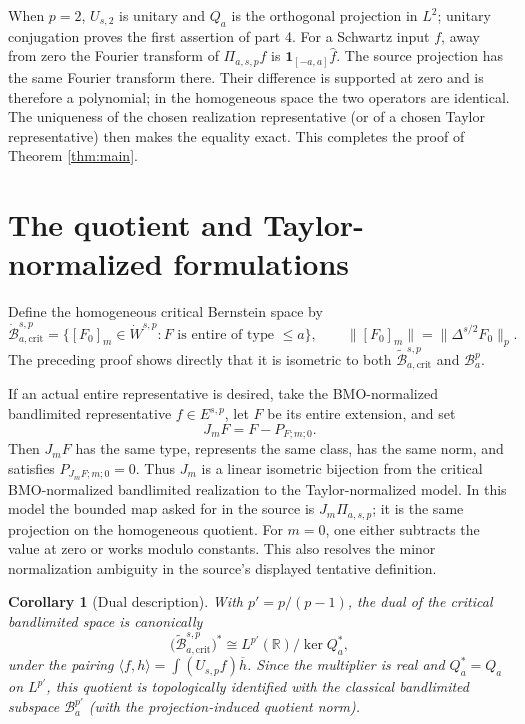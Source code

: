 \documentclass[11pt]{article}
\newtheorem{corollary}[theorem]{Corollary}
\newcommand{\R}{\mathbb R}
\newcommand{\crit}{\mathrm{crit}}
\begin{document}
When $p=2$, $U_{s,2}$ is unitary and $Q_a$ is the orthogonal projection in
$L^2$; unitary conjugation proves the first assertion of part 4. For a
Schwartz input $f$, away from zero the Fourier transform of
$\Pi_{a,s,p}f$ is $\mathbf1_{[-a,a]}\widehat f$. The source projection has
the same Fourier transform there. Their difference is supported at zero and
is therefore a polynomial; in the homogeneous space the two operators are
identical. The uniqueness of the chosen realization representative (or of a
chosen Taylor representative) then makes the equality exact. This completes
the proof of Theorem \ref{thm:main}.

\section{The quotient and Taylor-normalized formulations}

Define the homogeneous critical Bernstein space by
\[
 \dot{\mathcal B}^{s,p}_{a,\crit}
 =\big\{[F_0]_m\in\dot W^{s,p}:F\text{ is entire of type }\leq a\big\},
 \qquad
 \|[F_0]_m\|=\|\Delta^{s/2}F_0\|_p.
\]
The preceding proof shows directly that it is isometric to both
$\widetilde{\mathcal B}^{s,p}_{a,\crit}$ and $\mathcal B_a^p$.

If an actual entire representative is desired, take the BMO-normalized
bandlimited representative $f\in E^{s,p}$, let $F$ be its entire extension,
and set
\[
 J_mF=F-P_{F;m;0}.
\]
Then $J_mF$ has the same type, represents the same class, has the same norm,
and satisfies $P_{J_mF;m;0}=0$. Thus $J_m$ is a linear isometric bijection
from the critical BMO-normalized bandlimited realization to the
Taylor-normalized model. In this model the bounded map asked for in the
source is $J_m\Pi_{a,s,p}$; it is the same projection on the homogeneous
quotient. For $m=0$, one either subtracts the value at zero or works modulo
constants. This also resolves the minor normalization ambiguity in the
source's displayed tentative definition.

\begin{corollary}[Dual description]
With $p'=p/(p-1)$, the dual of the critical bandlimited space is canonically
\[
 \big(\widetilde{\mathcal B}^{s,p}_{a,\crit}\big)^*
 \cong L^{p'}(\R)/\ker Q_a^*,
\]
under the pairing
$\langle f,h\rangle=\int (U_{s,p}f)\overline h$. Since the multiplier is
real and $Q_a^*=Q_a$ on $L^{p'}$, this quotient is topologically identified
with the classical bandlimited subspace $\mathcal B_a^{p'}$ (with the
projection-induced quotient norm).
\end{corollary}
\end{document}
